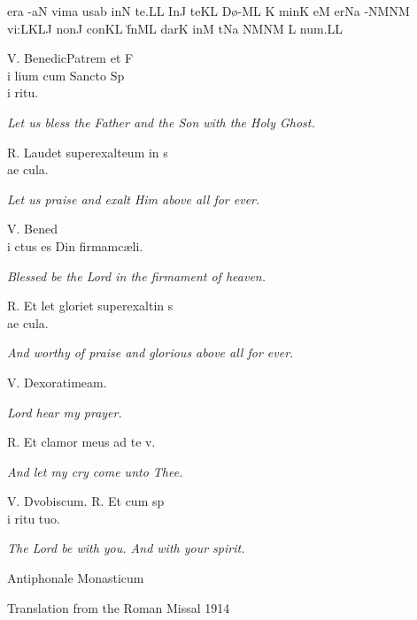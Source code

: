 er\punctum a\egn
\sgn {}{\a}-\clivis aN\egn
\sgn vim\punctum a\egn
\sgn {}us\pes ab\egn
\spatium
\sgn {}in\bivirga N\egn
\spatium
\sgn te.\punctum L\augmentum L\egn
\spatium
\divisiofinalis
\spatium
\sgn {}In\punctum J\egn
\spatium
\sgn te{}\pes KL\egn
\spatium
\sgn D{\o}-\clivis ML\egn
\custos K
\lineaproxima
\sgn min\punctum K\egn
\sgn {}e{}\punctum M\egn
\spatium
{}er\pes Na\egn
\sgn {}{\a}-\clivis NM\clivis NM\egn
\sgn vi:\clivis LK\augmentumduplex LJ\egn
\spatium
\divisiominor
\spatium
\sgn non\punctum J\egn
\spatium
\sgn con\pes KL\egn
\sgn f{\u}n\clivis ML\egn
\sgn dar\punctum K\egn
\spatium
\sgn {}in\punctum M\egn
\spatium
\sgn {}{\ae}t\pes Na\egn
{}\clivis NM\virga N\spatiumparvum\punctuminclinatumparvum M%
\nonspatium\punctuminclinatumparvum L\egn
\sgn nu{m.}\punctum L\augmentum L\egn
\spatium
\Finisgregoriana

\bigskip

\s V. Benedic\amus Patrem et F\\i lium cum Sancto Sp\\i ritu.

{\hskip5mm \it Let us bless the Father and the Son with the Holy Ghost.}

\s R. Laud\emus et superexalt\emus eum in s\\ae cula.

{\hskip15mm \it Let us praise and exalt Him above all for ever.}

\s V. Bened\\i ctus es D\omine in firmam\ento c\ae li.

{\hskip15mm \it Blessed be the Lord in the firmament of heaven.}

\s R. Et l\audabilis et glori\osus et superexalt\atus in s\\ae cula.

{\hskip15mm \it And worthy of praise and glorious above all for ever.}

\s V. D\omine ex\audi orati\one meam.

{\hskip15mm \it Lord hear my prayer.}

\s R. Et clamor meus ad te v\eniat.

{\hskip15mm \it And let my cry come unto Thee.}

\s V. D\ominus vobiscum. \s R. Et cum sp\\i ritu tuo.

{\hskip15mm \it The Lord be with you.  And with your spirit.}

\bigskip

\source Antiphonale Monasticum

\source Translation from the Roman Missal 1914


